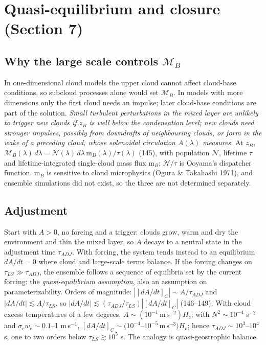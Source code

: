 \documentclass[10pt,a4paper]{article}
\newcommand{\MB}{\mathcal M_B}
\begin{document}
\section{Quasi-equilibrium and closure (Section 7)}
\subsection{Why the large scale controls $\MB$} In one-dimensional cloud models the upper cloud cannot affect cloud-base conditions, so subcloud processes alone would set $\MB$. In models with more dimensions only the first cloud needs an impulse; later cloud-base conditions are part of the solution. \emph{Small turbulent perturbations in the mixed layer are unlikely to trigger new clouds if $z_B$ is well below the condensation level; new clouds need stronger impulses, possibly from downdrafts of neighbouring clouds, or form in the wake of a preceding cloud, whose solenoidal circulation $A(\lambda)$ measures.} At $z_B$, $\MB(\lambda)\,d\lambda=\mathcal N(\lambda)\,d\lambda\,\mathrm m_B(\lambda)/\tau(\lambda)$ (145), with population $\mathcal N$, lifetime $\tau$ and lifetime-integrated single-cloud mass flux $\mathrm m_B$; $\mathcal N/\tau$ is Ooyama's dispatcher function. $\mathrm m_B$ is sensitive to cloud microphysics (Ogura \& Takahashi 1971), and ensemble simulations did not exist, so the three are not determined separately.

\subsection{Adjustment} Start with $A>0$, no forcing and a trigger: clouds grow, warm and dry the environment and thin the mixed layer, so $A$ decays to a neutral state in the adjustment time $\tau_{ADJ}$. With forcing, the system tends instead to an equilibrium $dA/dt=0$ where cloud and large-scale terms balance. If the forcing changes on $\tau_{LS}\gg\tau_{ADJ}$, the ensemble follows a sequence of equilibria set by the current forcing: the \emph{quasi-equilibrium assumption}, also an assumption on parameterizability. Orders of magnitude: $|[dA/dt]_C|\sim A/\tau_{ADJ}$ and $|dA/dt|\lesssim A/\tau_{LS}$, so $|dA/dt|\lesssim(\tau_{ADJ}/\tau_{LS})|[dA/dt]_C|$ (146--149). With cloud excess temperatures of a few degrees, $A\sim(10^{-1}\,\mathrm{m\,s^{-2}})H_c$; with $N^2\sim10^{-4}$ s$^{-2}$ and $\sigma_cw_c\sim0.1$--1 m\,s$^{-1}$, $[dA/dt]_C\sim(10^{-4}$--$10^{-5}\,\mathrm{m\,s^{-3}})H_c$; hence $\tau_{ADJ}\sim10^3$--$10^4$ s, one to two orders below $\tau_{LS}\gtrsim10^5$ s. The analogy is quasi-geostrophic balance.
\end{document}
